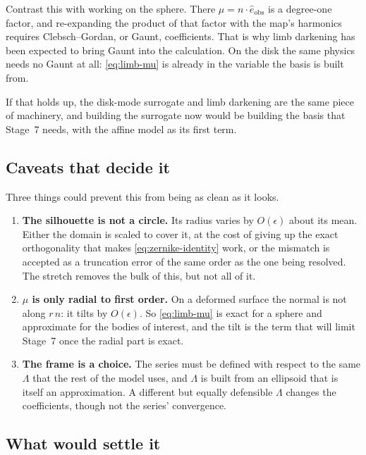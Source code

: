 Contrast this with working on the sphere.  There $\mu = n\cdot\hat e_\text{obs}$ is a
degree-one factor, and re-expanding the product of that factor with the map's harmonics
requires Clebsch--Gordan, or Gaunt, coefficients.  That is why limb darkening has been
expected to bring Gaunt into the calculation.  On the disk the same physics needs no Gaunt
at all: \eqref{eq:limb-mu} is already in the variable the basis is built from.

If that holds up, the disk-mode surrogate and limb darkening are the same piece of
machinery, and building the surrogate now would be building the basis that Stage~7 needs,
with the affine model as its first term.

\subsection{Caveats that decide it}
\label{sec:disk-modes-caveats}

Three things could prevent this from being as clean as it looks.

\begin{enumerate}
  \item \textbf{The silhouette is not a circle.}  Its radius varies by $O(\epsilon)$ about
    its mean.  Either the domain is scaled to cover it, at the cost of giving up the exact
    orthogonality that makes \eqref{eq:zernike-identity} work, or the mismatch is accepted as
    a truncation error of the same order as the one being resolved.  The stretch removes the
    bulk of this, but not all of it.
  \item \textbf{$\mu$ is only radial to first order.}  On a deformed surface the normal is
    not along $r\,n$: it tilts by $O(\epsilon)$.  So \eqref{eq:limb-mu} is exact for a
    sphere and approximate for the bodies of interest, and the tilt is the term that will
    limit Stage~7 once the radial part is exact.
  \item \textbf{The frame is a choice.}  The series must be defined with respect to the same
    $\Lambda$ that the rest of the model uses, and $\Lambda$ is built from an ellipsoid that
    is itself an approximation.  A different but equally defensible $\Lambda$ changes the
    coefficients, though not the series' convergence.
\end{enumerate}

\subsection{What would settle it}
\label{sec:disk-modes-test}

